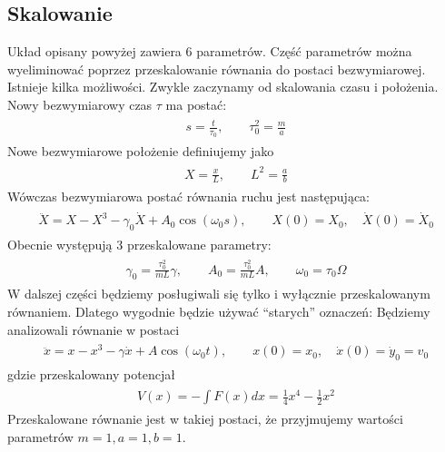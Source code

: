 \documentclass[a4paper,12pt,polish]{sphinxmanual}
\begin{document}
\subsection{Skalowanie}
\label{ch2/chII011:skalowanie}
Układ opisany powyżej zawiera 6 parametrów. Część parametrów można wyeliminować poprzez przeskalowanie równania do postaci bezwymiarowej. Istnieje kilka  możliwości. Zwykle zaczynamy od skalowania czasu i położenia. Nowy bezwymiarowy czas $\tau$ ma postać:
\label{ch2/chII011:equation-eqn3}\begin{gather}
\begin{split}s = \frac{t}{\tau_0}, \qquad \tau_0^2 = \frac{m}{a}\end{split}\label{ch2/chII011-eqn3}
\end{gather}
Nowe bezwymiarowe położenie definiujemy jako
\label{ch2/chII011:equation-eqn4}\begin{gather}
\begin{split}X = \frac{x}{L}, \qquad L^2 = \frac{a}{b}\end{split}\label{ch2/chII011-eqn4}
\end{gather}
Wówczas bezwymiarowa postać równania ruchu jest następująca:
\label{ch2/chII011:equation-eqn5}\begin{gather}
\begin{split}\ddot X = X - X^3 - \gamma_0 \dot X + A_0 \cos(\omega_0 s), \qquad X(0) = X_0, \quad  \dot X(0) = \dot X_0\end{split}\label{ch2/chII011-eqn5}
\end{gather}
Obecnie występują 3 przeskalowane parametry:
\label{ch2/chII011:equation-eqn6}\begin{gather}
\begin{split} \gamma_0  = \frac{\tau_0^2}{m L} \gamma, \qquad A_0 = \frac{\tau_0^2}{m L} A, \qquad \omega_0 = \tau_0 \Omega\end{split}\label{ch2/chII011-eqn6}
\end{gather}
W dalszej części będziemy posługiwali się tylko i wyłącznie przeskalowanym równaniem. Dlatego wygodnie będzie używać ``starych'' oznaczeń: Będziemy analizowali równanie w postaci
\label{ch2/chII011:equation-eqn7}\begin{gather}
\begin{split}\ddot x = x - x^3 - \gamma \dot x + A \cos(\omega_0 t ), \qquad x(0) = x_0, \quad  \dot x(0) = \dot y_0 = v_0\end{split}\label{ch2/chII011-eqn7}
\end{gather}
gdzie przeskalowany potencjał
\label{ch2/chII011:equation-eqn7a}\begin{gather}
\begin{split}V(x) = - \int F(x) dx = \frac{1}{4} x^4 - \frac{1}{2} x^2\end{split}\label{ch2/chII011-eqn7a}
\end{gather}
Przeskalowane równanie jest w takiej postaci, że przyjmujemy wartości parametrów $m=1,  a=1,  b=1$.
\end{document}
